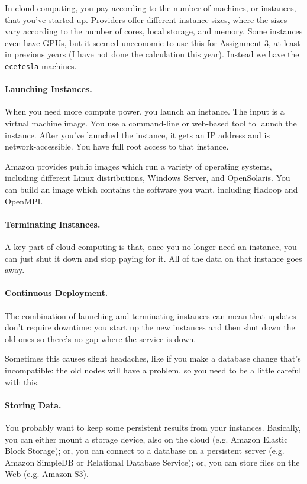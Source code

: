 \documentclass[a4paper]{report}
\begin{document}
In cloud computing, you pay according to the number of machines, or
instances, that you've started up. Providers offer different instance
sizes, where the sizes vary according to the number of cores, local
storage, and memory. Some instances even have GPUs, but it seemed 
uneconomic to use this for Assignment 3, at least in previous years (I
have not done the calculation this year). 
Instead we have the {\tt ecetesla} machines.

\paragraph{Launching Instances.} When you need more compute power,
you launch an instance. The input is a virtual machine image.  You use
a command-line or web-based tool to launch the instance.  After you've
launched the instance, it gets an IP address and is
network-accessible. You have full root access to that instance.

Amazon provides public images which run a variety of operating
systems, including different Linux distributions, Windows Server, and
OpenSolaris. You can build an image which contains the software you
want, including Hadoop and OpenMPI.

\paragraph{Terminating Instances.} A key part of cloud computing is
that, once you no longer need an instance, you can just shut it down
and stop paying for it. All of the data on that instance goes away.

\paragraph{Continuous Deployment.} The combination of launching and terminating instances can mean that updates don't require downtime: you start up the new instances and then shut down the old ones so there's no gap where the service is down.

Sometimes this causes slight headaches, like if you make a database change that's incompatible: the old nodes will have a problem, so you need to be a little careful with this.

\paragraph{Storing Data.} You probably want to keep some persistent results
from your instances. Basically, you can either mount a storage device,
also on the cloud (e.g. Amazon Elastic Block Storage); or, you can
connect to a database on a persistent server (e.g. Amazon SimpleDB or
Relational Database Service); or, you can store files on the Web
(e.g. Amazon S3). 
\end{document}
